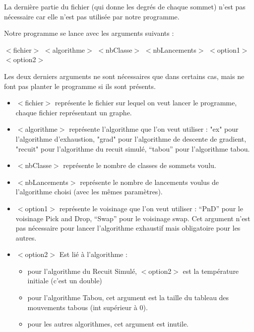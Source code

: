 \documentclass[12pt]{article}
\begin{document}
\bigskip

La dernière partie du fichier (qui donne les degrés de chaque sommet) n’est pas nécessaire car elle n’est pas utilisée par notre programme.
\bigskip

Notre programme se lance avec les arguments suivants :

   $<$fichier$>$ $<$algorithme$>$ $<$nbClasse$>$ $<$nbLancements$>$ $<$option1$>$ $<$option2$>$

\bigskip
   Les deux derniers arguments ne sont nécessaires que dans certains cas, mais ne font pas planter le programme si ils sont présents.

	\begin{itemize}
   \item $<$fichier$>$ représente le fichier sur lequel on veut lancer le programme, chaque fichier représentant un graphe.

  \item  $<$algorithme$>$ représente l'algorithme que l'on veut utiliser : "ex" pour l'algorithme d'exhaustion, "grad" pour l'algorithme de descente de gradient, "recuit" pour l'algorithme du recuit simulé, “tabou” pour l’algorithme tabou.

   \item $<$nbClasse$>$ représente le nombre de classes de sommets voulu.

	\item $<$nbLancements$>$ représente le nombre de lancements voulus de l'algorithme choisi (avec les mêmes paramètres).

   \item $<$option1$>$ représente le voisinage que l’on veut utiliser : “PnD” pour le voisinage Pick and Drop, “Swap” pour le voisinage swap. Cet argument n’est pas nécessaire pour lancer l’algorithme exhaustif mais obligatoire pour les autres.

   \item $<$option2$>$ Est lié à l’algorithme :
		\begin{itemize}
		\item pour l’algorithme du Recuit Simulé, $<$option2$>$ est la température initiale (c’est un double)
		\item pour l’algorithme Tabou, cet argument est la taille du tableau des mouvements tabous (int supérieur à 0).
    	\item pour les autres algorithmes, cet argument est inutile.
    	\end{itemize}
	\end{itemize}
	
\end{document}
